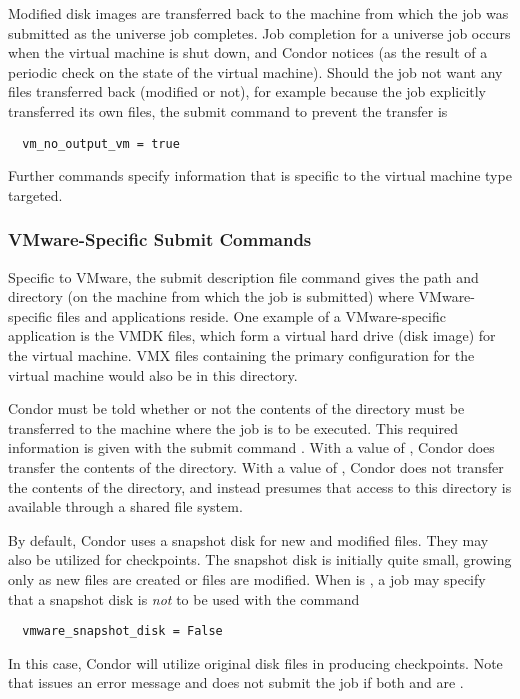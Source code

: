 Modified disk images are transferred back to the machine from which
the job was submitted as the  universe job completes.
Job completion for a  universe job occurs when 
the virtual machine is shut down, and Condor notices 
(as the result of a periodic check on the state of the virtual machine).
Should the job not want any files transferred back (modified or not),
for example because the job explicitly transferred its own files,
the submit command to prevent the transfer is
\begin{verbatim}
  vm_no_output_vm = true
\end{verbatim}

Further commands specify information that is specific to the
virtual machine type targeted.

\subsubsection{\label{sec:vm-VMwaresubmitfile}VMware-Specific Submit Commands}

Specific to VMware, the submit description file command
 gives the path and directory
(on the machine from which the job is submitted)
where VMware-specific files and applications reside.
One example of a VMware-specific application is the VMDK files,
which form a virtual hard drive (disk image) for the virtual machine.
VMX files containing the primary configuration for the virtual
machine would also be in this directory.

Condor must be told whether or not the contents of the 
directory must be transferred to the machine where the job is
to be executed.
This required information is given with the submit command
.
With a value of ,
Condor does transfer the contents of the directory.
With a value of ,
Condor does not transfer the contents of the directory,
and instead presumes that access to this directory is
available through a shared file system.

By default, Condor uses a snapshot disk for new and modified files.
They may also be utilized for checkpoints.
The snapshot disk is initially quite small,
growing only as new files are created or files are modified.
When  is ,
a job may specify that a snapshot disk is \emph{not} to be
used with the command
\begin{verbatim}
  vmware_snapshot_disk = False
\end{verbatim}
In this case, Condor will utilize original disk files in producing
checkpoints. 
Note that  issues an error message and does not
submit the job if both 
and  are .


